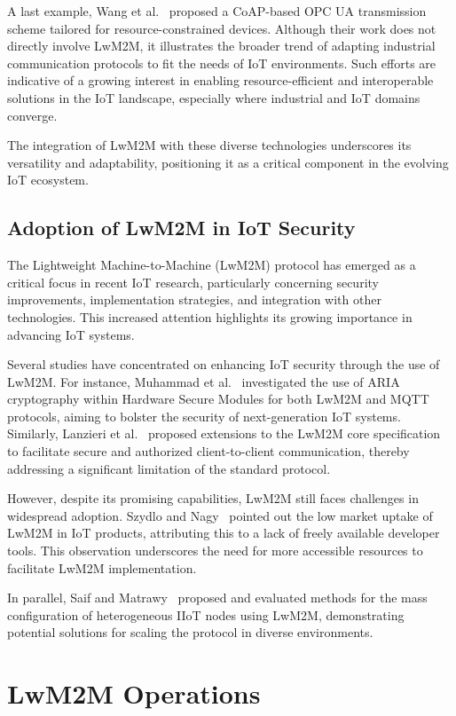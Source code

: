\documentclass[11pt,sigconf]{iabart}
\begin{document}
A last example, Wang et al.~\cite{pop00015} proposed a CoAP-based OPC UA transmission scheme tailored for resource-constrained devices. Although their work does not directly involve LwM2M, it illustrates the broader trend of adapting industrial communication protocols to fit the needs of IoT environments. Such efforts are indicative of a growing interest in enabling resource-efficient and interoperable solutions in the IoT landscape, especially where industrial and IoT domains converge.

The integration of LwM2M with these diverse technologies underscores its versatility and adaptability, positioning it as a critical component in the evolving IoT ecosystem.

\subsection{ Adoption of LwM2M in IoT Security}

The Lightweight Machine-to-Machine (LwM2M) protocol has emerged as a critical focus in recent IoT research, particularly concerning security improvements, implementation strategies, and integration with other technologies. This increased attention highlights its growing importance in advancing IoT systems.

Several studies have concentrated on enhancing IoT security through the use of LwM2M. For instance, Muhammad et al.~\cite{pop00001} investigated the use of ARIA cryptography within Hardware Secure Modules for both LwM2M and MQTT protocols, aiming to bolster the security of next-generation IoT systems. Similarly, Lanzieri et al.~\cite{pop00011} proposed extensions to the LwM2M core specification to facilitate secure and authorized client-to-client communication, thereby addressing a significant limitation of the standard protocol.

However, despite its promising capabilities, LwM2M still faces challenges in widespread adoption. Szydlo and Nagy~\cite{pop00003} pointed out the low market uptake of LwM2M in IoT products, attributing this to a lack of freely available developer tools. This observation underscores the need for more accessible resources to facilitate LwM2M implementation.

In parallel, Saif and Matrawy~\cite{pop00005} proposed and evaluated methods for the mass configuration of heterogeneous IIoT nodes using LwM2M, demonstrating potential solutions for scaling the protocol in diverse environments.

\section{LwM2M Operations} \label{operations}
\end{document}
